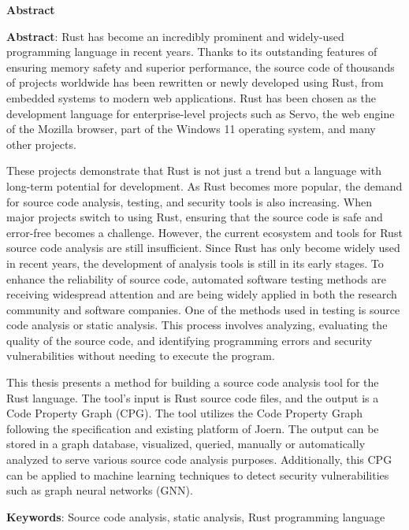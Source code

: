 \begin{center}
\textbf{\large{Abstract}	}
\end{center}

\begin{small}

\textbf{Abstract}:
Rust has become an incredibly prominent and widely-used programming language in recent years. Thanks to its outstanding features of ensuring memory safety and superior performance, the source code of thousands of projects worldwide has been rewritten or newly developed using Rust, from embedded systems to modern web applications. Rust has been chosen as the development language for enterprise-level projects such as Servo, the web engine of the Mozilla browser, part of the Windows 11 operating system, and many other projects.

These projects demonstrate that Rust is not just a trend but a language with long-term potential for development. As Rust becomes more popular, the demand for source code analysis, testing, and security tools is also increasing. When major projects switch to using Rust, ensuring that the source code is safe and error-free becomes a challenge. However, the current ecosystem and tools for Rust source code analysis are still insufficient. Since Rust has only become widely used in recent years, the development of analysis tools is still in its early stages. To enhance the reliability of source code, automated software testing methods are receiving widespread attention and are being widely applied in both the research community and software companies. One of the methods used in testing is source code analysis or static analysis. This process involves analyzing, evaluating the quality of the source code, and identifying programming errors and security vulnerabilities without needing to execute the program.

This thesis presents a method for building a source code analysis tool for the Rust language. The tool's input is Rust source code files, and the output is a Code Property Graph (CPG). The tool utilizes the Code Property Graph following the specification and existing platform of Joern. The output can be stored in a graph database, visualized, queried, manually or automatically analyzed to serve various source code analysis purposes. Additionally, this CPG can be applied to machine learning techniques to detect security vulnerabilities such as graph neural networks (GNN).

\vspace*{1cm}
\textbf{Keywords}: Source code analysis, static analysis, Rust programming language
\end{small}